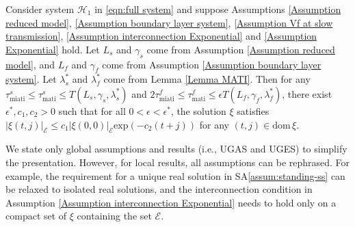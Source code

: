 \begin{thm}
Consider system $\mathcal{H}_1$ in \eqref{eqn:full system} and suppose Assumptions \ref{Assumption reduced model}, \ref{Assumption boundary layer system}, \ref{Assumption Vf at slow transmission}, \ref{Assumption interconnection Exponential} and \ref{Assumption Exponential} hold.
Let $L_s$ and $\gamma_s$ come from Assumption \ref{Assumption reduced model}, and $L_f$ and $\gamma_f$ come from Assumption \ref{Assumption boundary layer system}.
%
Let 
$\lambda_s^*$ and $\lambda_f^*$ come from Lemma \ref{Lemma MATI}.
%
Then for any $\tau_{\text{miati}}^s \leq \tau_{\text{mati}}^s \leq T(L_s, \gamma_s, \lambda_s^*)$ and $ 2\tau_{\text{miati}}^f \leq \tau_{\text{mati}}^f \leq \epsilon T(L_f, \gamma_f,\lambda_f^*)$, there exist $\epsilon^*, c_1, c_2 >0 $ such that for all $0<\epsilon<\epsilon^*$, the solution $\xi$ satisfies $|\xi(t,j)|_\mathcal{E} \leq c_1 |\xi(0,0)|_\mathcal{E} \text{exp}( -c_2(t+j))$ for any $(t,j)\in \text{dom} \, \xi$.
\label{Theorem Exponential decay}
\end{thm}
%
%
\begin{rem}
    We state only global assumptions and results (i.e., UGAS and UGES) to simplify the presentation. However, for local results, all assumptions can be rephrased. For example, the requirement for a unique real solution in SA\ref{assum:standing-ss} can be relaxed to isolated real solutions, and the interconnection condition in Assumption \ref{Assumption interconnection Exponential} needs to hold only on a compact set of $\xi$ containing the set $\mathcal{E}$. 
\end{rem}



